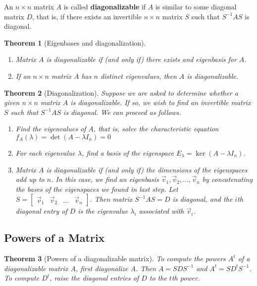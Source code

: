 \documentclass[letter]{article}
\newtheorem{theorem}{Theorem}[section]
\newenvironment{definition}[1][Definition]{\begin{trivlist}
\item[\hskip \labelsep {\bfseries #1}]}{\end{trivlist}}
\begin{document}
\begin{definition}
An $n\times n$ matrix $A$ is called \textbf{diagonalizable} if $A$ is similar to some diagonal matrix $D$, that is, if there exists an invertible $n\times n$ matrix $S$ such that $S^{-1}AS$ is diagonal.
\end{definition}

\begin{theorem}[Eigenbases and diagonalization]
\begin{enumerate}
\item Matrix $A$ is diagonalizable if (and only if) there exists and eigenbasis for $A$.
\item If an $n\times n$ matrix $A$ has $n$ distinct eigenvalues, then $A$ is diagonalizable.
\end{enumerate}
\end{theorem}

\begin{theorem}[Diagonalization]
Suppose we are asked to determine whether a given $n\times n$ matrix $A$ is diagonalizable. If so, we wish to find an invertible matrix $S$ such that $S^{-1}AS$ is diagonal.
We can proceed as follows.
\begin{enumerate}
\item Find the eigenvalues of $A$, that is, solve the characteristic equation $f_A(\lambda) = \det(A - \lambda I_n) = 0$
\item For each eigenvalue $\lambda$, find a basis of the eigenspace $E_\lambda = \ker(A - \lambda I_n)$.
\item Matrix $A$ is diagonalizable if (and only if) the dimensions of the eigenspaces add up to $n$. In this case, we find an eigenbasis $\vec v_1, \vec v_2, \ldots, \vec v_n$ by concatenating the bases of the eigenspaces we found in last step. Let $S = \begin{bmatrix}
\vec v_1& \vec v_2 & \ldots & \vec v_n
\end{bmatrix}$. Then matrix $S^{-1}AS = D$ is diagonal, and the $i$th diagonal entry of $D$ is the eigenvalue $\lambda_i$ associated with $\vec v_i$.
\end{enumerate}
\end{theorem}

\subsection{Powers of a Matrix}
\begin{theorem}[Powers of a diagonalizable matrix]
To compute the powers $A^t$ of a diagonalizable matrix $A$, first diagonalize A. Then $A = SDS^{-1}$ and $A^t = SD^tS^{-1}$.  To compute $D^t$, raise the diagonal entries of $D$ to the $t$th power. 
\end{theorem}
\end{document}
